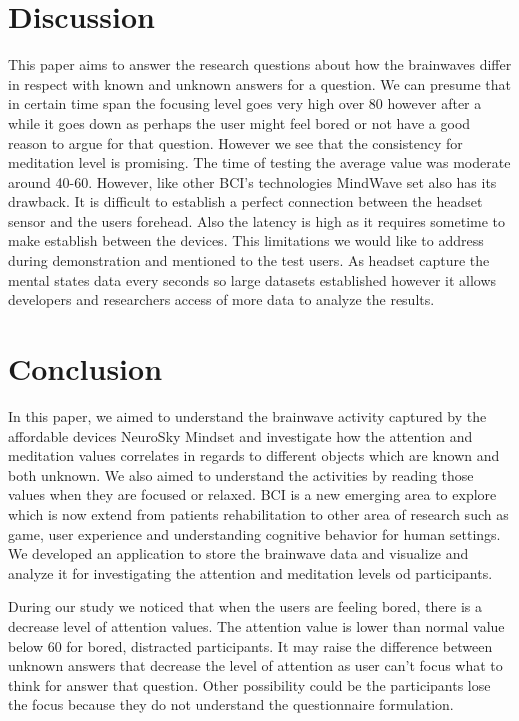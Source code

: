 \documentclass{bioinfo}
\begin{document}
\section{Discussion}
This paper aims to answer the research questions about how the brainwaves differ in respect with known and unknown answers for a question. We can presume that in certain time span the focusing level goes very high over 80 however after a while it goes down as perhaps the user might feel bored or not have a good reason to argue for that question. However we see that the consistency for meditation level is promising. The time of testing the average value was moderate around 40-60.
However, like other BCI's technologies MindWave set also has its drawback.
It is difficult to establish a perfect connection between the headset
sensor and the users forehead. Also the latency is high as it requires sometime to make establish between the devices. This limitations we would like to address during demonstration and mentioned to the test users. As headset capture the mental states data every seconds so large datasets established however it allows developers and researchers access of more data to analyze the results. 

\section{Conclusion}

In this paper, we aimed to understand the brainwave activity captured by the affordable devices NeuroSky Mindset and investigate how the attention and meditation values correlates in regards to different objects which are known and both unknown. We also aimed to understand the activities by reading those values when they are focused or relaxed. BCI is a new emerging area to explore which is now extend from patients rehabilitation to other area  of research such as game, user experience and understanding cognitive behavior for human settings. We developed an application to store the brainwave data and visualize and analyze it for investigating the attention and meditation levels od participants. 

During our study we noticed that when the users are feeling bored, there is a decrease level of attention values. The attention value is lower than normal value below 60 for bored, distracted participants. It may raise the difference  between unknown answers that decrease the level of attention as user can't focus what to think for answer that question. Other possibility could be the participants lose the focus because they do not understand the questionnaire formulation.
\end{document}
